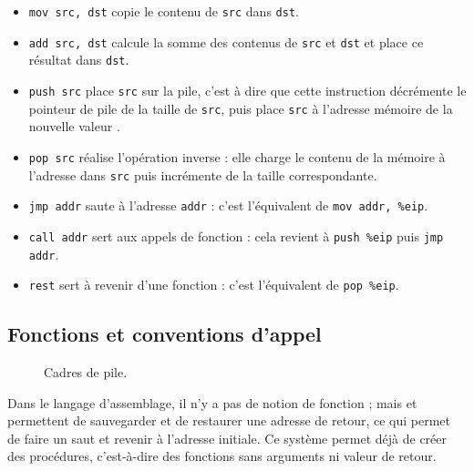 \begin{itemize}

\item \texttt{mov src, dst} copie le contenu de \texttt{src} dans \texttt{dst}.

\item \texttt{add src, dst} calcule la somme des contenus de \texttt{src} et
  \texttt{dst} et place ce résultat dans \texttt{dst}.

\item \texttt{push src} place \texttt{src} sur la pile, c'est à dire que cette
  instruction décrémente le pointeur de pile \esp de la taille de \texttt{src},
  puis place \texttt{src} à l'adresse mémoire de la nouvelle valeur \esp.

\item \texttt{pop src} réalise l'opération inverse : elle charge le contenu de
  la mémoire à l'adresse \esp dans \texttt{src} puis incrémente \esp de la
  taille correspondante.

\item \texttt{jmp addr} saute à l'adresse \texttt{addr} : c'est l'équivalent de
  \texttt{mov addr, \%eip}.

\item \texttt{call addr} sert aux appels de fonction : cela revient à
  \texttt{push \%eip} puis \texttt{jmp addr}.

\item \texttt{rest} sert à revenir d'une fonction : c'est l'équivalent de
  \texttt{pop \%eip}.

\end{itemize}

\subsection{Fonctions et conventions d'appel}

\begin{figure} %

\caption[Cadres de pile]{ Cadres de pile. }
\label{fig:stackframe}
\end{figure} %

Dans le langage d'assemblage, il n'y a pas de notion de fonction ; mais
 et  permettent de sauvegarder et de restaurer une
adresse de retour, ce qui permet de faire un saut et revenir à l'adresse initiale.
Ce système permet déjà de créer des procédures, c'est-à-dire des fonctions sans
arguments ni valeur de retour.

